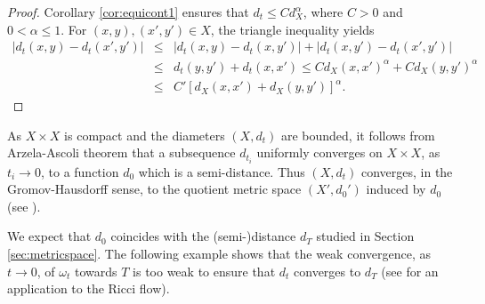 \documentclass[a4paper,11pt,leqno,english]{smfart}
\theoremstyle{plain}
\theoremstyle{plain}
\numberwithin{equation}{section} %
\numberwithin{figure}{section} %
\theoremstyle{plain}
\theoremstyle{plain}
\theoremstyle{remark}
\theoremstyle{remark}
\theoremstyle{definition}
\theoremstyle{plain}
\theoremstyle{plain}
\theoremstyle{definition}
\begin{document}
\begin{proof}
Corollary \ref{cor:equicont1} ensures that
$d_t \leq C d_X^{\alpha}$, where $C>0$ and $0 < \alpha \leq 1$.
For $(x,y), (x',y') \in X$, the triangle inequality yields
\begin{eqnarray*}
\left| d_t(x,y)-d_t(x',y') \right| &\leq &
\left| d_t(x,y)-d_t(x,y') \right|+\left| d_t(x,y')-d_t(x',y') \right| \\
& \leq & d_t(y,y')+d_t(x,x') \leq C d_X(x,x')^{\alpha}+C d_X(y,y')^{\alpha} \\
& \leq & C' \left[ d_X(x,x')+d_X(y,y') \right]^{\alpha}.
\end{eqnarray*}
\end{proof}


As $X \times X$ is compact and the diameters $(X,d_t)$ are bounded, it follows
from Arzela-Ascoli theorem that a subsequence 
$d_{t_i}$ uniformly converges on $X \times X$, as $t_i \rightarrow 0$, to a function
$d_0$ which is a semi-distance.
Thus $(X,d_t)$ converges, in the Gromov-Hausdorff sense, to
the quotient metric space $(X',d_0')$ induced by $d_0$
(see \cite[Example 7.4.4]{BBI01}).


We expect that $d_0$ coincides with the (semi-)distance $d_T$ studied in Section \ref{sec:metricspace}.
The following example shows that the weak convergence, as $t \rightarrow 0$, of $\omega_t$ towards $T$
is  too weak to ensure that $d_t$ converges to $d_{T}$ 
(see \cite{Top21} for an application to the Ricci flow).
\end{document}
